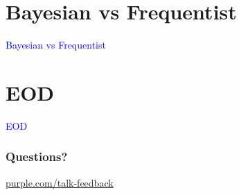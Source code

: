 \documentclass[t]{beamer}
\newcommand\blue[1]{\textcolor{blue}{#1}}
\newcommand\talksection[1]{\section{#1}
\begin{frame}
  \vfill\Huge\bf\blue{\centerline{#1}}
\end{frame}
}
\begin{document}
\begin{frame}
  \frametitle{}

  \note{

  }
\end{frame}

\begin{frame}
  \frametitle{}

  \note{

  }
\end{frame}

\begin{frame}
  \frametitle{}

  \note{

  }
\end{frame}

\begin{frame}
  \frametitle{}

  \note{

  }
\end{frame}

\talksection{Bayesian vs Frequentist}

\begin{frame}
  \frametitle{}

  \note{

  }
\end{frame}

\begin{frame}
  \frametitle{}

  \note{

  }
\end{frame}

\begin{frame}
  \frametitle{}

  \note{

  }
\end{frame}

\begin{frame}
  \frametitle{}

  \note{

  }
\end{frame}

\begin{frame}
  \frametitle{}

  \note{

  }
\end{frame}

\begin{frame}
  \frametitle{}

  \note{

  }
\end{frame}

\begin{frame}
  \frametitle{}

  \note{

  }
\end{frame}

\talksection{EOD}

\begin{frame}
  \frametitle{Questions?}
  \vspace{3cm}
  \centerline{\large\url{purple.com/talk-feedback}}
\end{frame}
\end{document}
